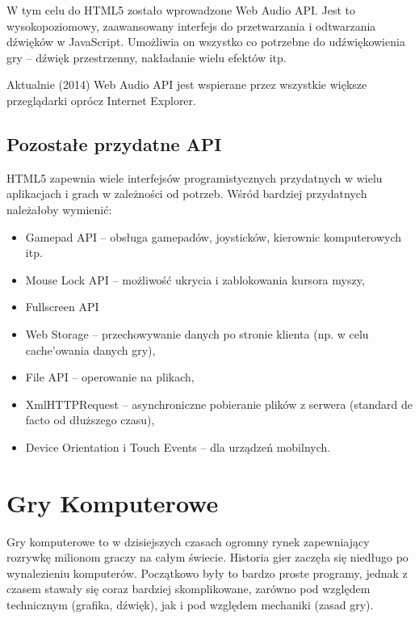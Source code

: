 W tym celu do HTML5 zostało wprowadzone Web Audio API. Jest to wysokopoziomowy, zaawansowany
interfejs do przetwarzania i odtwarzania dźwięków w JavaScript. Umożliwia on wszystko co
potrzebne do udźwiękowienia gry -- dźwięk przestrzenny, nakładanie wielu efektów itp.

Aktualnie (2014) Web Audio API jest wspierane przez wszystkie większe przeglądarki oprócz
Internet Explorer.

\subsection{Pozostałe przydatne API}
\label{ssec:pozostaleApi}

HTML5 zapewnia wiele interfejsów programistycznych przydatnych w wielu aplikacjach
i grach w zależności od potrzeb. Wśród bardziej przydatnych należałoby wymienić:
\begin{itemize}
\item Gamepad API -- obsługa gamepadów, joysticków, kierownic komputerowych itp.
\item Mouse Lock API -- możliwość ukrycia i zablokowania kursora myszy,
\item Fullscreen API
\item Web Storage -- przechowywanie danych po stronie klienta (np. w celu cache'owania danych gry),
\item File API -- operowanie na plikach,
\item XmlHTTPRequest -- asynchroniczne pobieranie plików z serwera (standard de facto
  od dłuższego czasu),
\item Device Orientation i Touch Events -- dla urządzeń mobilnych.
\end{itemize}


\section{Gry Komputerowe}
\label{sec:gryKomputerowe}

Gry komputerowe to w dzisiejszych czasach ogromny rynek zapewniający rozrywkę milionom graczy
na całym świecie. Historia gier zaczęła się niedługo po wynalezieniu komputerów. Początkowo
były to bardzo proste programy, jednak z czasem stawały się coraz bardziej skomplikowane,
zarówno pod względem technicznym (grafika, dźwięk), jak i pod względem mechaniki (zasad gry).

